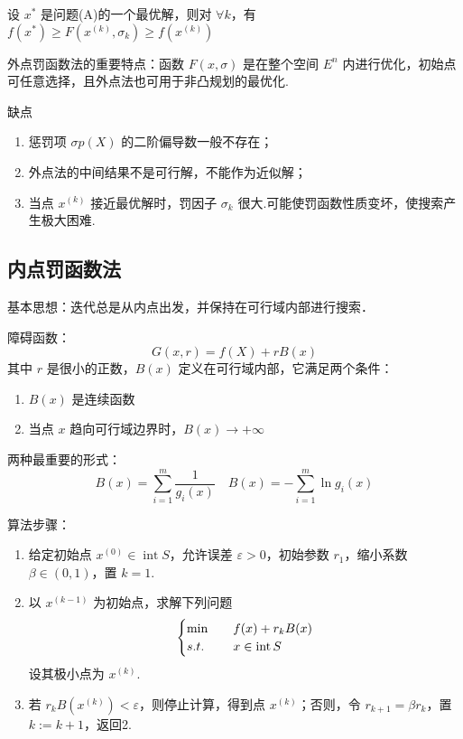 \begin{theorem}
    设 $x^*$ 是问题(A)的一个最优解，则对 $\forall k$，有$f(x^*) \ge F(x^{(k)}, \sigma_k) \ge f(x^{(k)})$
\end{theorem}

\begin{note}
    外点罚函数法的重要特点：函数 $F(x, \sigma)$ 是在整个空间 $E^n$ 内进行优化，初始点可任意选择，且外点法也可用于非凸规划的最优化.

    缺点\begin{enumerate}
        \item 惩罚项 $\sigma p(X)$ 的二阶偏导数一般不存在；
        \item 外点法的中间结果不是可行解，不能作为近似解；
        \item 当点 $x^{(k)}$ 接近最优解时，罚因子 $\sigma_k$ 很大.可能使罚函数性质变坏，使搜索产生极大困难.
    \end{enumerate}
\end{note}

\subsection{内点罚函数法}
基本思想：迭代总是从内点出发，并保持在可行域内部进行搜索．

\begin{note}
    障碍函数：\[G(x, r) = f(X) + rB(x)\]
    其中 $r$ 是很小的正数，$B(x)$ 定义在可行域内部，它满足两个条件：\begin{enumerate}
        \item $B(x)$ 是连续函数
        \item 当点 $x$ 趋向可行域边界时，$B(x) \to +\infty$
    \end{enumerate}
    两种最重要的形式：\[B(x) = \sum_{i = 1}^m \frac{1}{g_i(x)} \quad B(x) = -\sum_{i = 1}^m\ln g_i(x)\]
\end{note}

\begin{note}
    算法步骤：\begin{enumerate}
        \item 给定初始点 $x^{(0)} \in \operatorname{int} S$，允许误差 $\varepsilon > 0$，初始参数 $r_1$，缩小系数 $\beta\in (0, 1)$，置 $k=1$.
        \item 以 $x^{(k - 1)}$ 为初始点，求解下列问题\[\begin{cases}
            \min \quad &f(x) + r_kB(x)\\
            s.t. \quad &x \in \operatorname{int} S
        \end{cases}\]设其极小点为 $x^{(k)}$.
        \item 若 $r_kB(x^{(k)}) < \varepsilon$，则停止计算，得到点 $x^{(k)}$；否则，令 $r_{k + 1} = \beta r_k$，置 $k := k + 1$，返回2.
    \end{enumerate}
\end{note}

